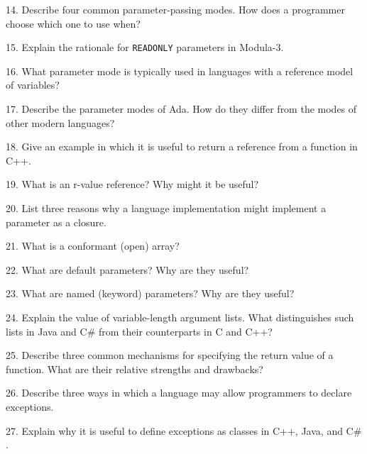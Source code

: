 \filbreak
\vskip 1cm

14. Describe four common parameter-passing modes. How does a programmer choose which one to use when?

\filbreak
\vskip 1cm

15. Explain the rationale for {\tt READONLY} parameters in Modula-3.

\filbreak
\vskip 1cm

16. What parameter mode is typically used in languages with a reference model of variables?

\filbreak
\vskip 1cm

17. Describe the parameter modes of Ada. How do they differ from the modes of other modern languages?

\filbreak
\vskip 1cm

18. Give an example in which it is useful to return a reference from a function in C++.

\filbreak
\vskip 1cm

19. What is an r-value reference? Why might it be useful?

\filbreak
\vskip 1cm

20. List three reasons why a language implementation might implement a parameter as a closure.

\filbreak
\vskip 1cm

21. What is a conformant (open) array?

\filbreak
\vskip 1cm

22. What are default parameters? Why are they useful?

\filbreak
\vskip 1cm

23. What are named (keyword) parameters? Why are they useful?

\filbreak
\vskip 1cm

24. Explain the value of variable-length argument lists. What distinguishes such lists in Java and C$\#$ from their counterparts in C and C++?

\filbreak
\vskip 1cm

25. Describe three common mechanisms for specifying the return value of a function. What are their relative strengths and drawbacks?

\filbreak
\vskip 1cm

26. Describe three ways in which a language may allow programmers to declare exceptions.

\filbreak
\vskip 1cm

27. Explain why it is useful to define exceptions as classes in C++, Java, and C$\#$.

